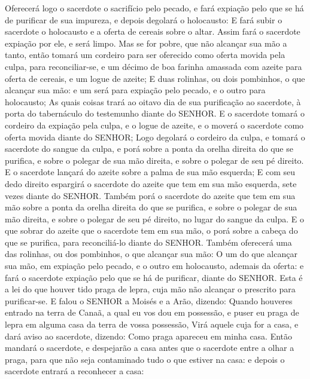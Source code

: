 {Oferecerá logo o sacerdote o sacrifício pelo pecado, e fará expiação pelo que se há de purificar de sua impureza, e depois degolará o holocausto:
E fará subir o sacerdote o holocausto e a oferta de cereais sobre o altar. Assim fará o sacerdote expiação por ele, e será limpo.
Mas se for pobre, que não alcançar sua mão a tanto, então tomará um cordeiro para ser oferecido como oferta movida pela culpa, para reconciliar-se, e um décimo
{} de boa farinha amassada com azeite para oferta de cereais, e um logue de azeite;
E duas rolinhas, ou dois pombinhos, o que alcançar sua mão: e um será para expiação pelo pecado, e o outro para holocausto;
As quais coisas trará ao oitavo dia de sua purificação ao sacerdote, à porta do tabernáculo do testemunho diante do SENHOR.
E o sacerdote tomará o cordeiro da expiação pela culpa, e o logue de azeite, e o moverá o sacerdote como oferta movida diante do SENHOR;
Logo degolará o cordeiro da culpa, e tomará o sacerdote do sangue da culpa, e porá sobre a ponta da orelha direita do que se purifica, e sobre o polegar de sua mão direita, e sobre o polegar de seu pé direito.
E o sacerdote lançará do azeite sobre a palma de sua mão esquerda;
E com seu dedo direito espargirá o sacerdote do azeite que tem em sua mão esquerda, sete vezes diante do SENHOR.
Também porá o sacerdote do azeite que tem em sua mão sobre a ponta da orelha direita do que se purifica, e sobre o polegar de sua mão direita, e sobre o polegar de seu pé direito, no lugar do sangue da culpa.
E o que sobrar do azeite que o sacerdote tem em sua mão, o porá sobre a cabeça do que se purifica, para reconciliá-lo diante do SENHOR.
Também oferecerá uma das rolinhas, ou dos pombinhos, o que alcançar sua mão:
O um do que alcançar sua mão, em expiação pelo pecado, e o outro em holocausto, ademais da oferta: e fará o sacerdote expiação pelo que se há de purificar, diante do SENHOR.
Esta é a lei do que houver tido praga de lepra, cuja mão não alcançar o prescrito para purificar-se.
E falou o SENHOR a Moisés e a Arão, dizendo:
Quando houveres entrado na terra de Canaã, a qual eu vos dou em possessão, e puser eu praga de lepra em alguma casa da terra de vossa possessão,
Virá aquele cuja for a casa, e dará aviso ao sacerdote, dizendo: Como praga apareceu em minha casa.
Então mandará o sacerdote, e despejarão a casa antes que o sacerdote entre a olhar a praga, para que não seja contaminado tudo o que estiver na casa: e depois o sacerdote entrará a reconhecer a casa:
}
